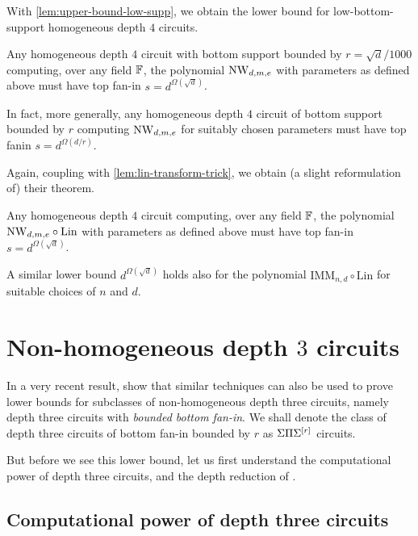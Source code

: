 With \autoref{lem:upper-bound-low-supp}, we obtain the lower bound for low-bottom-support homogeneous depth $4$ circuits. 

\begin{theorem}[\cite{KS14}]\label{thm:IMM-lowsup-lb}
Any homogeneous depth $4$ circuit with bottom support bounded by $r = \sqrt{d}/1000$ computing, over any field $\mathbb{F}$, the polynomial $\mathrm{NW}_{d,m,e}$ with parameters as defined above must have top fan-in $s = d^{\Omega(\sqrt{d})}$. 

In fact, more generally, any homogeneous depth $4$ circuit of bottom support bounded by $r$ computing $\mathrm{NW}_{d,m,e}$ for suitably chosen parameters must have top fanin $s = d^{\Omega(d/r)}$. 
\end{theorem}

Again, coupling with \autoref{lem:lin-transform-trick}, we obtain (a slight reformulation of) their theorem. 

\begin{theorem}\label{thm:IMM-lb}
Any homogeneous depth $4$ circuit computing, over any field $\mathbb{F}$,  the polynomial $\mathrm{NW}_{d,m,e}\circ \mathrm{Lin}$ with parameters as defined above must have top fan-in $s = d^{\Omega(\sqrt{d})}$. 

A similar lower bound $d^{\Omega(\sqrt{d})}$ holds also for the polynomial $\mathrm{IMM}_{n,d} \circ \mathrm{Lin}$ for suitable choices of $n$ and $d$. 
\end{theorem}

\section{Non-homogeneous depth $3$ circuits}\label{sec:kayalsaha}

In a very recent result, \cite{KayalSaha14} show that similar techniques can also be used to prove lower bounds for subclasses of non-homogeneous depth three circuits, namely depth three circuits with \emph{bounded bottom fan-in}. We shall denote the class of depth three circuits of bottom fan-in bounded by $r$ as $\Sigma\Pi\Sigma^{[r]}$ circuits. 

But before we see this lower bound, let us first understand the computational power of depth three circuits, and the depth reduction of \cite{gkks13b}. 

\subsection{Computational power of depth three circuits}

